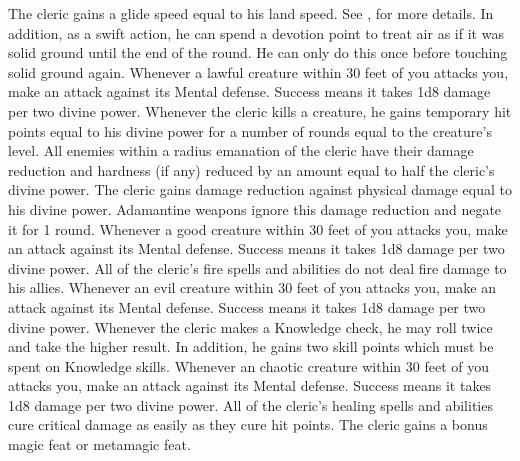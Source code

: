             The cleric gains a glide speed equal to his land speed.
            See , for more details.
            In addition, as a swift action, he can spend a devotion point to treat air as if it was solid ground until the end of the round.
            He can only do this once before touching solid ground again.
            Whenever a lawful creature within 30 feet of you attacks you, make an attack against its Mental defense.
            Success means it takes 1d8 damage per two divine power.
            Whenever the cleric kills a creature, he gains temporary hit points equal to his divine power for a number of rounds equal to the creature's level.
            All enemies within a \areamed radius emanation of the cleric have their damage reduction and hardness (if any) reduced by an amount equal to half the cleric's divine power.
            The cleric gains damage reduction against physical damage equal to his divine power.
            Adamantine weapons ignore this damage reduction and negate it for 1 round.
            Whenever a good creature within 30 feet of you attacks you, make an attack against its Mental defense.
            Success means it takes 1d8 damage per two divine power.
            All of the cleric's fire spells and abilities do not deal fire damage to his allies.
            Whenever an evil creature within 30 feet of you attacks you, make an attack against its Mental defense.
            Success means it takes 1d8 damage per two divine power.
            Whenever the cleric makes a Knowledge check, he may roll twice and take the higher result.
            In addition, he gains two skill points which must be spent on Knowledge skills.
            Whenever an chaotic creature within 30 feet of you attacks you, make an attack against its Mental defense.
            Success means it takes 1d8 damage per two divine power.
            All of the cleric's healing spells and abilities cure critical damage as easily as they cure hit points.
            The cleric gains a bonus magic feat or metamagic feat.
